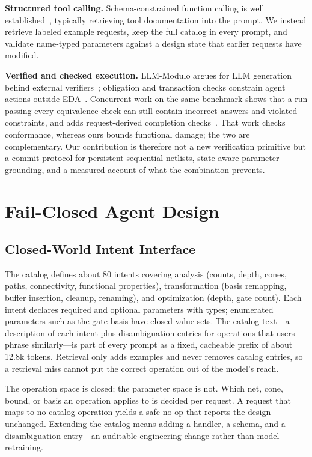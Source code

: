 \documentclass[conference,letterpaper]{IEEEtran}
\begin{document}
\textbf{Structured tool calling.} Schema-constrained function calling is well
established~\cite{gorilla,toolllm,bfcl}, typically retrieving tool
documentation into the prompt. We instead retrieve labeled example requests,
keep the full catalog in every prompt, and validate name-typed parameters
against a design state that earlier requests have modified.

\textbf{Verified and checked execution.} LLM-Modulo argues for LLM generation
behind external verifiers~\cite{llmmodulo}; obligation and transaction checks
constrain agent actions outside EDA~\cite{refineact,toolgate,taubench}.
Concurrent work on the same benchmark shows that a run passing every
equivalence check can still contain incorrect answers and violated
constraints, and adds request-derived completion checks~\cite{companion}. That
work checks conformance, whereas ours bounds functional damage; the two are
complementary. Our contribution is therefore not a new verification primitive
but a commit protocol for persistent sequential netlists, state-aware
parameter grounding, and a measured account of what the combination prevents.

\section{Fail-Closed Agent Design}
\label{sec:design}


\subsection{Closed-World Intent Interface}
\label{sec:interface}

The catalog defines about 80 intents covering analysis (counts, depth, cones,
paths, connectivity, functional properties), transformation (basis remapping,
buffer insertion, cleanup, renaming), and optimization (depth, gate count).
Each intent declares required and optional parameters with types; enumerated
parameters such as the gate basis have closed value sets. The catalog
text---a description of each intent plus disambiguation entries for
operations that users phrase similarly---is part of every prompt as a fixed,
cacheable prefix of about 12.8k tokens. Retrieval only adds examples and never
removes catalog entries, so a retrieval miss cannot put the correct operation
out of the model's reach.

The operation space is closed; the parameter space is not. Which net, cone,
bound, or basis an operation applies to is decided per request. A request that
maps to no catalog operation yields a safe no-op that reports the design
unchanged. Extending the catalog means adding a handler, a schema, and a
disambiguation entry---an auditable engineering change rather than model
retraining.
\end{document}
